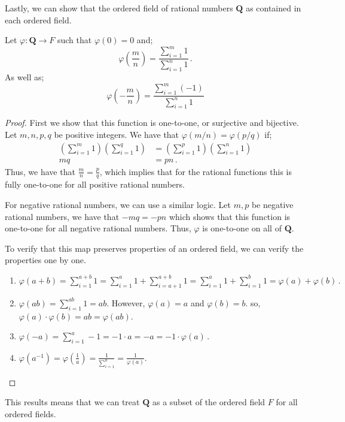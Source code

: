 Lastly, we can show that the ordered field of rational numbers $\mathbf{Q}$ as contained in each ordered field.
\begin{definition}
    Let $\varphi:\mathbf{Q} \rightarrow F$ such that $\varphi(0) = 0$ and;
    \begin{equation}
        \varphi\left(\frac{m}{n}\right) = \frac{\sum_{i=1}^{m} 1}{\sum_{i=1}^{n} 1}\,.
    \end{equation}
    As well as;
    \begin{equation}
        \varphi\left(-\frac{m}{n}\right) = \frac{\sum_{i=1}^{m} (-1)}{\sum_{i=1}^{n} 1}
    \end{equation}
\end{definition}
\begin{proof}
    First we show that this function is one-to-one, or surjective and bijective. Let $m,n,p,q$ be positive integers. We have that $\varphi(m/n) = \varphi(p/q)$ if;
    \begin{align*}
        (\sum_{i=1}^{m} 1)(\sum_{i=1}^{q} 1) &= (\sum_{i=1}^{p} 1)(\sum_{i=1}^{n} 1) \\
        mq &= pn\,.
    \end{align*}
    Thus, we have that $\frac{m}{n} = \frac{p}{q}$, which implies that for the rational functions this is fully one-to-one for all positive rational numbers.

    For negative rational numbers, we can use a similar logic. Let $m,p$ be negative rational numbers, we have that $-mq = -pn$ which shows that this function is one-to-one for all negative rational numbers. Thus, $\varphi$ is one-to-one on all of $\mathbf{Q}$.

    To verify that this map preserves properties of an ordered field, we can verify the properties one by one.
    \begin{enumerate}
        \item $\varphi(a + b) = \sum_{i=1}^{a + b} 1 = \sum_{i=1}^{a} 1 + \sum_{i=a+1}^{a + b} 1 = \sum_{i=1}^{a} 1 + \sum_{i=1}^{ b} 1 = \varphi(a) + \varphi(b)\,.$
        \item $\varphi(ab) = \sum_{i=1}^{ab} 1 = ab$. However, $\varphi(a) = a$ and $\varphi(b) = b$. so, $\varphi(a) \cdot \varphi(b) = ab = \varphi(ab)$.
        \item $\varphi(-a) = \sum_{i=1}^{a} -1 = -1 \cdot a = -a = -1 \cdot \varphi(a)\,.$
        \item $\varphi(a^{-1}) = \varphi(\frac{1}{a}) =\frac{1}{\sum_{i=1}^{a}} = \frac{1}{\varphi(a)}$.
    \end{enumerate}
\end{proof}
This results means that we can treat $\mathbf{Q}$ as a subset of the ordered field $F$ for all ordered fields.

